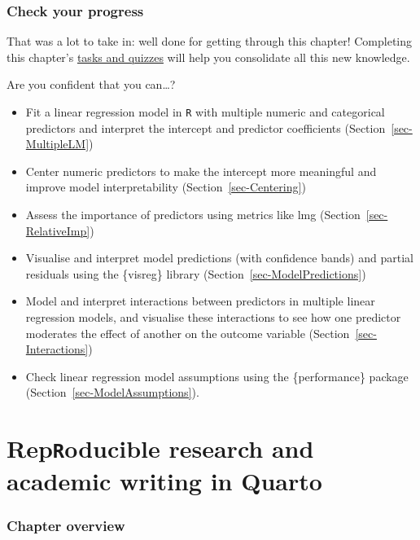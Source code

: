 \documentclass[
  letterpaper,
  DIV=11,
  numbers=noendperiod]{scrreprt}
\providecommand{\tightlist}{%
  \setlength{\itemsep}{0pt}\setlength{\parskip}{0pt}}
\begin{document}
\subsection*{Check your progress}\label{check-your-progress-25}

That was a lot to take in: well done for getting through this chapter!
Completing this chapter's
\href{https://elenlefoll.github.io/RstatsTextbook/quizzes/13_quiz.html}{tasks
and quizzes} will help you consolidate all this new
knowledge.~

Are you confident that you can\ldots?

\begin{itemize}
\tightlist
\item[$\square$]
  Fit a linear regression model in \texttt{R} with multiple numeric and
  categorical predictors and interpret the intercept and predictor
  coefficients (Section~\ref{sec-MultipleLM})
\item[$\square$]
  Center numeric predictors to make the intercept more meaningful and
  improve model interpretability (Section~\ref{sec-Centering})
\item[$\square$]
  Assess the importance of predictors using metrics like lmg
  (Section~\ref{sec-RelativeImp})
\item[$\square$]
  Visualise and interpret model predictions (with confidence bands) and
  partial residuals using the \{visreg\} library
  (Section~\ref{sec-ModelPredictions})
\item[$\square$]
  Model and interpret interactions between predictors in multiple linear
  regression models, and visualise these interactions to see how one
  predictor moderates the effect of another on the outcome variable
  (Section~\ref{sec-Interactions})
\item[$\square$]
  Check linear regression model assumptions using the \{performance\}
  package (Section~\ref{sec-ModelAssumptions}).
\end{itemize}


\chapter{\texorpdfstring{Rep\texttt{R}oducible research and academic
writing in
Quarto}{RepRoducible research and academic writing in Quarto}}\label{sec-LiteRateProgramming}

\subsection*{Chapter overview}\label{chapter-overview-13}
\end{document}
